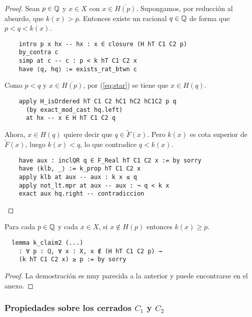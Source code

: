 \begin{proof}
  Sean $p \in \mathbb{Q}$ y $x \in X$ con $x \in \overline{H(p)}$. Supongamos, por reducción al absurdo, que $k(x) > p$. Entonces existe un racional $q \in \mathbb{Q}$ de forma que $p < q < k(x)$.

  \begin{lstlisting}
    intro p x hx -- hx : x ∈ closure (H hT C1 C2 p)
    by_contra c
    simp at c -- c : p < k hT C1 C2 x
    have ⟨q, hq⟩ := exists_rat_btwn c \end{lstlisting}

  Como $p < q$ y $x \in \overline{H(p)}$, por (\ref{eq:star}) se tiene que $x \in H(q)$. 

  \begin{lstlisting}
    apply H_isOrdered hT C1 C2 hC1 hC2 hC1C2 p q
      (by exact_mod_cast hq.left)
      at hx -- x ∈ H hT C1 C2 q \end{lstlisting}

  Ahora, $x \in H(q)$ quiere decir que $q \in \tilde{F}(x)$. Pero $k(x)$ es cota superior de $\tilde{F}(x)$, luego $k(x) < q$, lo que contradice $q < k(x)$.

  \begin{lstlisting}
    have aux : inclQR q ∈ F_Real hT C1 C2 x := by sorry
    have ⟨klb, _⟩ := k_prop hT C1 C2 x
    apply klb at aux -- aux : k x ≤ q
    apply not_lt.mpr at aux -- aux : ¬ q < k x
    exact aux hq.right -- contradiccion\end{lstlisting}
\end{proof}

\begin{lemma}\label{claim2}
  Para cada $p \in \mathbb{Q}$ y cada $x \in X$, si $x \notin H(p)$ entonces $k(x) \geq p$.
\end{lemma}

\begin{lstlisting}
  lemma k_claim2 (...)
    : ∀ p : ℚ, ∀ x : X, x ∉ (H hT C1 C2 p) →
    (k hT C1 C2 x) ≥ p := by sorry
\end{lstlisting}

\begin{proof}
  La demostración es muy parecida a la anterior y puede encontrarse en el anexo.
\end{proof}

\subsubsection{Propiedades sobre los cerrados $C_1$ y $C_2$}

